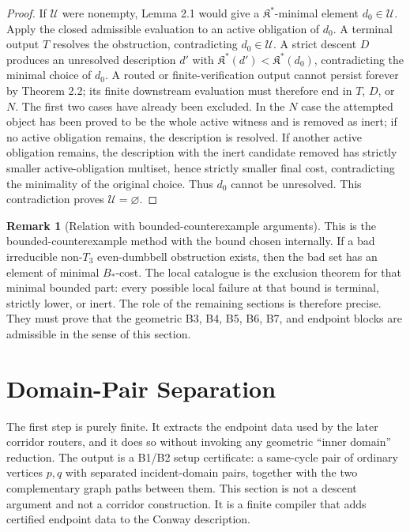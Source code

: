 \documentclass[11pt]{amsart}
\theoremstyle{definition}
\newtheorem{remark}[theorem]{Remark}
\begin{document}
\begin{proof}
If \(\mathcal U\) were nonempty, Lemma 2.1 would give a
\(\mathfrak K^\ast\)-minimal element \(d_0\in\mathcal U\). Apply the closed
admissible evaluation to an active obligation of \(d_0\). A terminal output \(T\)
resolves the obstruction, contradicting \(d_0\in\mathcal U\). A strict descent
\(D\) produces an unresolved description \(d'\) with
\(\mathfrak K^\ast(d')<\mathfrak K^\ast(d_0)\), contradicting the minimal choice
of \(d_0\). A routed or finite-verification output cannot persist forever by
Theorem 2.2; its finite downstream evaluation must therefore end in \(T\), \(D\), or
\(N\). The first two cases have already been excluded. In the \(N\) case the
attempted object has been proved to be the whole active witness and is removed
as inert; if no active obligation remains, the description is resolved. If
another active obligation remains, the description with the inert candidate
removed has strictly smaller active-obligation multiset, hence strictly smaller final cost,
contradicting the minimality of the original choice. Thus \(d_0\) cannot be
unresolved. This contradiction proves \(\mathcal U=\varnothing\).

\end{proof}
\begin{remark}[Relation with bounded-counterexample arguments]
This is the
bounded-counterexample method with the bound chosen internally. If a bad
irreducible non-\(T_3\) even-dumbbell obstruction exists, then the bad set has an
element of minimal \(B_\ast\)-cost. The local catalogue is the exclusion theorem
for that minimal bounded part: every possible local failure at that bound is
terminal, strictly lower, or inert. The role of the remaining sections is
therefore precise. They must prove that the geometric B3, B4, B5, B6, B7, and
endpoint blocks are admissible in the sense of this section.


\end{remark}
\section{Domain-Pair Separation}

The first step is purely finite. It extracts the endpoint data used by the later
corridor routers, and it does so without invoking any geometric ``inner domain''
reduction. The output is a B1/B2 setup certificate: a same-cycle pair of
ordinary vertices \(p,q\) with separated incident-domain pairs, together with the
two complementary graph paths between them. This section is not a descent
argument and not a corridor construction. It is a finite compiler that adds
certified endpoint data to the Conway description.
\end{document}

